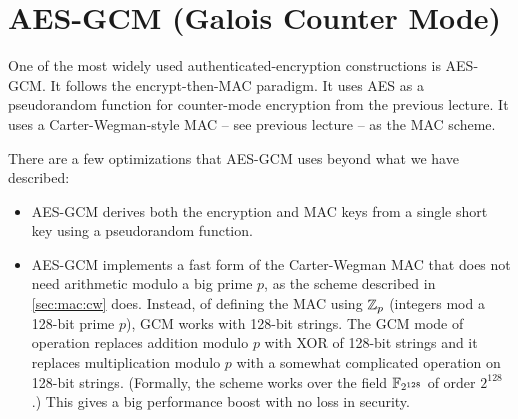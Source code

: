 \section{AES-GCM (Galois Counter Mode)}\label{sec:enc:gcm}
One of the most widely used authenticated-encryption constructions is AES-GCM.
It follows the encrypt-then-MAC paradigm.
It uses AES as a pseudorandom function for counter-mode encryption from the previous
lecture. %
It uses a Carter-Wegman-style MAC -- see previous lecture --
as the MAC scheme.

There are a few optimizations that AES-GCM uses beyond what we have described:
\begin{itemize}
  \item AES-GCM derives both the encryption and MAC keys from a single short key
        using a pseudorandom function.
  \item AES-GCM implements a fast form of the Carter-Wegman MAC that does not 
        need arithmetic modulo a big prime $p$, as the scheme described in \cref{sec:mac:cw} does.
        Instead, of defining the MAC using $\mathbb{Z}_p$ (integers mod a 128-bit prime $p$),
        GCM works with 128-bit strings.
        The GCM mode of operation replaces addition modulo $p$ with XOR of 128-bit strings
        and it replaces multiplication modulo $p$ with a somewhat complicated operation
        on 128-bit strings. 
        (Formally, the scheme works over the field $\mathbb{F}_{2^{128}}$ of order $2^{128}$.)
        This gives a big performance boost with no loss in security.
\end{itemize}



